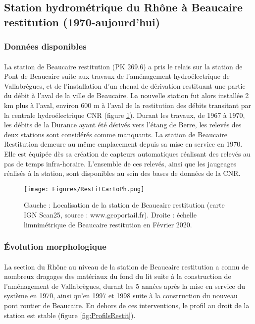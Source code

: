 \documentclass[11pt]{article}
\begin{document}
\FloatBarrier
	\subsection{Station hydrométrique du Rhône à Beaucaire restitution (1970-aujourd'hui)}
	
	\subsubsection{Données disponibles}

	\paragraph{} La station de Beaucaire restitution (PK 269.6) a pris le relais sur la station de Pont de Beaucaire suite aux travaux de l'aménagement hydroélectrique de Vallabrègues, et de l'installation d'un chenal de dérivation restituant une partie du débit à l'aval de la ville de Beaucaire. La nouvelle station fut alors installée 2 km plus à l'aval, environ 600 m à l'aval de la restitution des débits transitant par la centrale hydroélectrique CNR (figure \ref{fig:CartoRes}). Durant les travaux, de 1967 à 1970, les débits de la Durance ayant été dérivés vers l'étang de Berre, les relevés des deux stations sont considérés comme manquants. La station de Beaucaire Restitution demeure au même emplacement depuis sa mise en service en 1970. Elle est équipée dès sa création de capteurs automatiques réalisant des relevés au pas de temps infra-horaire. L'ensemble de ces relevés, ainsi que les jaugeages réalisés à la station, sont disponibles au sein des bases de données de la CNR.
		
	\begin{figure}[h]
	\centering
		\texttt{[image: Figures/RestitCartoPh.png]}
        \caption{Gauche : Localisation de la station de Beaucaire restitution (carte IGN Scan25, source : www.geoportail.fr). Droite : échelle limnimétrique de Beaucaire restitution en Février 2020.}	
		\label{fig:CartoRes}
	\end{figure}
	
	
		\subsubsection{Évolution morphologique}

	\paragraph{} La section du Rhône au niveau de la station de Beaucaire restitution a connu de nombreux dragages des matériaux du fond du lit suite à la construction de l'aménagement de Vallabrègues, durant les 5 années après la mise en service du système en 1970, ainsi qu'en 1997 et 1998 suite à la construction du nouveau pont routier de Beaucaire. En dehors de ces interventions, le profil au droit de la station est stable (figure \ref{fig:ProfilsRestit}). 
	
\end{document}
